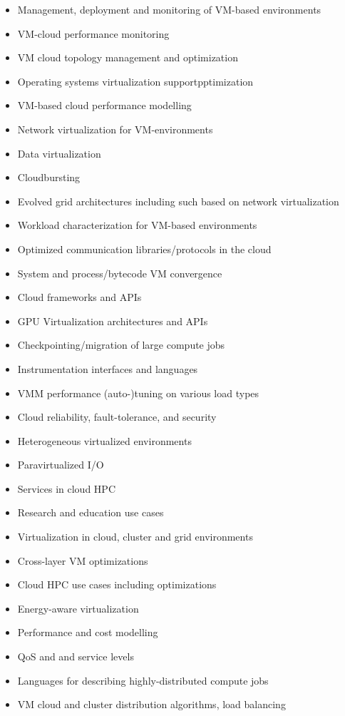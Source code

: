 \documentclass[a4shrink,portrait,final]{baposter}
\begin{document}
\begin{poster}
{\begin{itemize}
\item Management, deployment and monitoring of VM-based environments
\item VM-cloud performance monitoring
\item VM cloud topology management and optimization
\item Operating systems virtualization supportpptimization
\item VM-based cloud performance modelling
\item Network virtualization for VM-environments
\item Data virtualization
\item Cloudbursting
\item Evolved grid architectures including such based on network virtualization
\item Workload characterization for VM-based environments
\item Optimized communication libraries/protocols in the cloud
\item System and process/bytecode VM convergence
\item Cloud frameworks and APIs
\item GPU Virtualization architectures and APIs
\item Checkpointing/migration of large compute jobs
\item Instrumentation interfaces and languages
\item VMM performance (auto-)tuning on various load types
\item Cloud reliability, fault-tolerance, and security
\item Heterogeneous virtualized environments
\item Paravirtualized I/O
\item Services in cloud HPC
\item Research and education use cases
\item Virtualization in cloud, cluster and grid environments
\item Cross-layer VM optimizations
\item Cloud HPC use cases including optimizations
\item Energy-aware virtualization
\item Performance and cost modelling
\item QoS and and service levels
\item Languages for describing highly-distributed compute jobs
\item VM cloud and cluster distribution algorithms, load balancing

\end{itemize}}
\end{poster}
\end{document}
